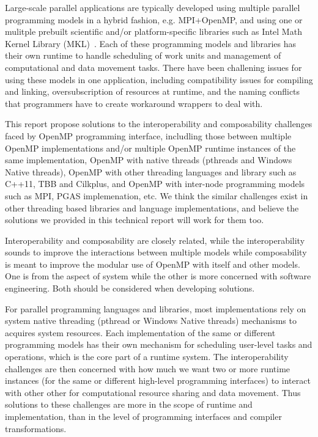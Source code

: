Large-scale parallel applications are typically developed using multiple parallel programming models in 
a hybrid fashion, e.g. MPI+OpenMP, and using one or mulitple prebuilt scientific and/or platform-specific libraries such as Intel Math Kernel Library (MKL)~\cite{wang2014intel}.
Each of these programming models and libraries has their own runtime to handle scheduling of work units and management of computational
and data movement tasks. There have been challening issues for using these models in one application, including 
compatibility issues for compiling and linking, oversubscription of resources at runtime, and the naming conflicts that 
programmers have to create workaround wrappers to deal with.

This report propose solutions to the interoperability and composability challenges faced by OpenMP programming interface, includling those
between multiple OpenMP implementations and/or multiple OpenMP runtime instances of the same implementation, OpenMP 
with native threads (pthreads and Windows Native threads), OpenMP with other threading languages and library such 
as C++11, TBB and Cilkplus, and OpenMP with inter-node programming models such as MPI, PGAS implemenation, etc. We 
think the similar challenges exist in other threading based libraries and language implementations, and believe
the solutions we provided in this technical report will work for them too.  

Interoperability and composability are closely related, while the interoperability sounds to improve the interactions between multiple models
while composability is meant to improve the modular use of OpenMP with itself and other models. One is from the aspect of system while 
the other is more concerned with software engineering. Both should be considered when developing solutions. 

For parallel programming languages and libraries, most implementations rely on system native threading (pthread or Windows Native threads) 
mechanisms to acquires system resources. Each implementation of the same or different programming models has their own mechanism for scheduling
user-level tasks and operations, which is the core part of a runtime system. 
The interoperability challenges are then concerned with how much we want two or more 
runtime instances (for the same or different high-level programming interfaces) to interact with other other for computational resource sharing
and data movement. Thus solutions to these challenges are more in the scope of runtime and implementation, than in the level of programming
interfaces and compiler transformations. 


